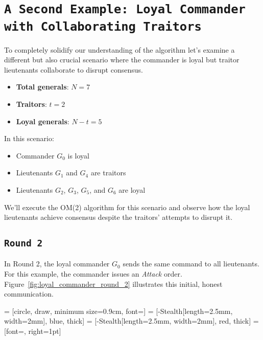 \documentclass[11pt]{article}
\newcommand{\gen}[1]{\ensuremath{G_{#1}}}
\begin{document}
\section*{\texttt{\Large A Second Example: Loyal Commander with Collaborating Traitors}}

\justifying
To completely solidify our understanding of the algorithm let's examine a different but also  crucial scenario where the commander is loyal but traitor lieutenants collaborate to disrupt consensus.

\begin{itemize}
    \item \textbf{Total generals}: $N = 7$
    \item \textbf{Traitors}: $t = 2$
    \item \textbf{Loyal generals}: $N - t = 5$
\end{itemize}

In this scenario:
\begin{itemize}
    \item Commander $\gen{0}$ is loyal
    \item Lieutenants $\gen{1}$ and $\gen{4}$ are traitors
    \item Lieutenants $\gen{2}$, $\gen{3}$, $\gen{5}$, and $\gen{6}$ are loyal
\end{itemize}

We'll execute the OM(2) algorithm for this scenario and observe how the loyal lieutenants achieve consensus despite the traitors' attempts to disrupt it.

\subsection*{\texttt{\large Round 2}}
\justifying
In Round 2, the loyal commander $\gen{0}$ sends the same command to all lieutenants. For this example, the commander issues an \textit{Attack} order. Figure~\ref{fig:loyal_commander_round_2} illustrates this initial, honest communication.

 = [circle, draw, minimum size=0.9cm, font=\small]
 = [-{Stealth[length=2.5mm, width=2mm]}, blue, thick] %
 = [-{Stealth[length=2.5mm, width=2mm]}, red, thick]  %
 = [font=\scriptsize, right=1pt]
\end{document}

